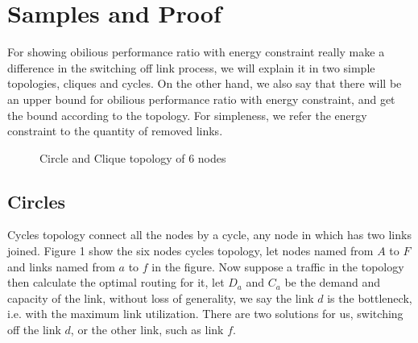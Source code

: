 \documentclass[conference]{IEEEtran}
\begin{document}
\section{Samples and Proof}
For showing obilious performance ratio with energy constraint really make a difference in the switching off link 
process, we will explain it in two simple topologies, cliques and cycles. On the other hand, we also say that
there will be an upper bound for obilious performance ratio with energy constraint, and get the bound according
to the topology. For simpleness, we refer the energy constraint to the quantity of removed links.

\begin{figure}[!t]
\centering
\vspace*{0.1in}
\hfill
{}
\caption{Circle and Clique topology of 6 nodes}
\vspace*{0.1in}
\end{figure}


\subsection{Circles}
Cycles topology connect all the nodes by a cycle, any node in which has two links joined. Figure 1 show the six
nodes cycles topology, let nodes named from $A$ to $F$ and links named from $a$ to $f$ in the figure.
Now suppose a traffic in the topology then calculate the optimal routing for it,
let $D_a$ and $C_a$ be the demand and capacity of the link, without loss of generality, we say the link $d$ is the 
bottleneck, i.e. with the maximum link utilization. There are two solutions for us, switching off the link $d$,
or the other link, such as link $f$.
\end{document}
